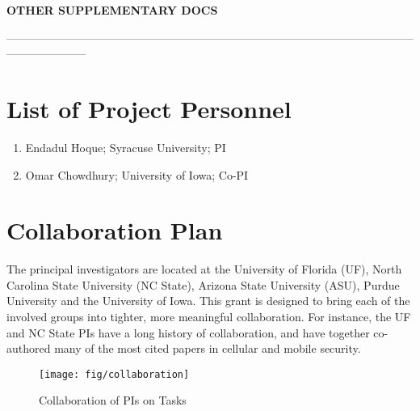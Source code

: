
{\Large
\begin{center}
\textbf{OTHER SUPPLEMENTARY DOCS}
\end{center}
}

\noindent---------------------------------------------------------------------------------------------------------------------------------

\section*{List of Project Personnel}

\begin{enumerate}
   \item Endadul Hoque; Syracuse University; PI
   \item Omar Chowdhury; University of Iowa; Co-PI
\end{enumerate}

\newpage

\section*{Collaboration Plan}

The principal investigators are located at the University of Florida
(UF), North Carolina State University (NC State), Arizona State University
(ASU), Purdue University and the University of Iowa. This grant is
designed to bring each of the involved groups into tighter, more
meaningful collaboration. For instance, the UF and NC State PIs have a long
history of collaboration, and have together co-authored many of the most
cited papers in cellular and mobile security. 

\begin{figure}
    \centering
    \texttt{[image: fig/collaboration]}
    \caption{Collaboration of PIs on Tasks}
    \label{fig:collab}
\end{figure}

